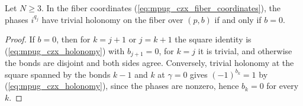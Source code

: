 \begin{lemma}
    \label{thm:mpug_czx_good_fibers}
    \leanok
    Let $N\geq3$. In the fiber coordinates
    (\ref{eq:mpug_czx_fiber_coordinates}), the phases $i^{q_j}$ have trivial
    holonomy on the fiber over $(p,b)$ if and only if $b=0$.
\end{lemma}

\begin{proof}\leanok
    If $b=0$, then for $k=j+1$ or $j=k+1$ the square identity is
    (\ref{eq:mpug_czx_holonomy}) with $b_{j+1}=0$, for $k=j$ it is trivial,
    and otherwise the bonds are disjoint and both sides agree. Conversely,
    trivial holonomy at the square spanned by the bonds $k-1$ and $k$ at
    $\gamma=0$ gives $(-1)^{b_k}=1$ by (\ref{eq:mpug_czx_holonomy}), since the
    phases are nonzero, hence $b_k=0$ for every $k$.
\end{proof}

